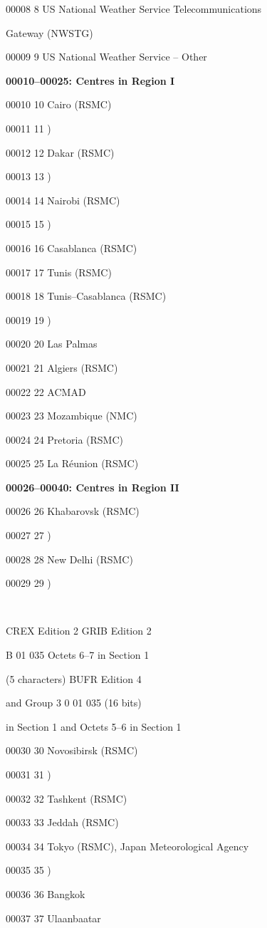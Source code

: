 00008 8 US National Weather Service Telecommunications

Gateway (NWSTG)

00009 9 US National Weather Service -- Other

\textbf{00010--00025: Centres in Region I}

00010 10 Cairo (RSMC)

00011 11 )

00012 12 Dakar (RSMC)

00013 13 )

00014 14 Nairobi (RSMC)

00015 15 )

00016 16 Casablanca (RSMC)

00017 17 Tunis (RSMC)

00018 18 Tunis--Casablanca (RSMC)

00019 19 )

00020 20 Las Palmas

00021 21 Algiers (RSMC)

00022 22 ACMAD

00023 23 Mozambique (NMC)

00024 24 Pretoria (RSMC)

00025 25 La Réunion (RSMC)

\textbf{00026--00040: Centres in Region II}

00026 26 Khabarovsk (RSMC)

00027 27 )

00028 28 New Delhi (RSMC)

00029 29 )

\textbf{\\
}

CREX Edition 2 GRIB Edition 2

B 01 035 Octets 6--7 in Section 1

(5 characters) BUFR Edition 4

and Group 3 0 01 035 (16 bits)

in Section 1 and Octets 5--6 in Section 1

00030 30 Novosibirsk (RSMC)

00031 31 )

00032 32 Tashkent (RSMC)

00033 33 Jeddah (RSMC)

00034 34 Tokyo (RSMC), Japan Meteorological Agency

00035 35 )

00036 36 Bangkok

00037 37 Ulaanbaatar

